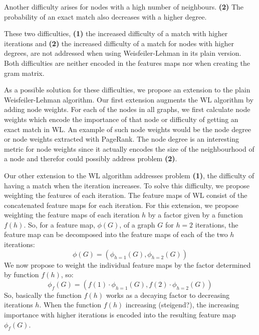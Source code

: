 Another difficulty arises for nodes with a high number of neighbours. \textbf{(2)} The probability of an exact match also decreases with a higher degree.

These two difficulties, \textbf{(1)} the increased difficulty of a match with higher iterations and \textbf{(2)} the increased difficulty of a match for nodes with higher degrees, are not addressed when using Weisfeiler-Lehman in its plain version. Both difficulties are neither encoded in the features maps nor when creating the gram matrix.

As a possible solution for these difficulties, we propose an extension to the plain Weisfeiler-Lehman algorithm.
Our first extension augments the WL algorithm by adding node weights.
For each of the nodes in all graphs, we first calculate node weights which encode the importance of that node or difficulty of getting an exact match in WL.
An example of such node weights would be the node degree or node weights extracted with PageRank.
The node degree is an interesting metric for node weights since it actually encodes the size of the neighbourhood of a node and therefor could possibly address problem \textbf{(2)}.

Our other extension to the WL algorithm addresses problem \textbf{(1)}, the difficulty of having a match when the iteration increases.
To solve this difficulty, we propose weighting the features of each iteration.
The feature maps of WL consist of the concatenated feature maps for each iteration.
For this extension, we propose weighting the feature maps of each iteration $h$ by a factor given by a function $f(h)$.
So, for a feature map, $\phi(G)$, of a graph $G$ for $h=2$ iterations, the feature map can be decomposed into the feature maps of each of the two $h$ iterations:
\begin{equation*}
\phi(G)=(\phi_{h=1}(G), \phi_{h=2}(G))
\end{equation*}
We now propose to weight the individual feature maps by the factor determined by function $f(h)$, so:
\begin{equation*}
\phi_{f}(G)=(f(1) \cdot \phi_{h=1}(G), f(2) \cdot \phi_{h=2}(G))
\end{equation*}
So, basically the function $f(h)$ works as a decaying factor to decreasing iterations $h$.
When the function $f(h)$ increasing (steigend?), the increasing importance with higher iterations is encoded into the resulting feature map $\phi_f(G)$.
